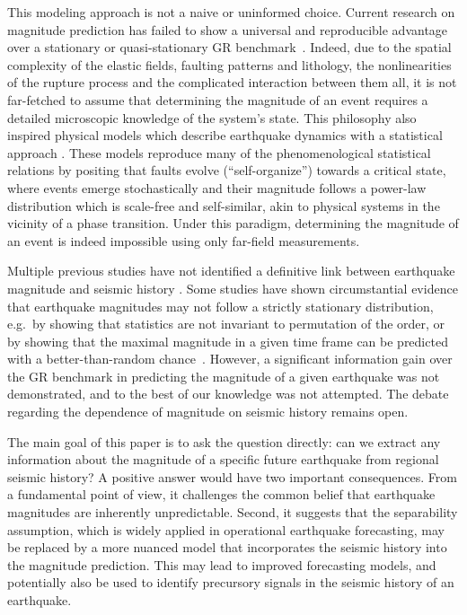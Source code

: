 \documentclass[pdflatex]{sn-jnl}
\begin{document}
This modeling approach is not a naive or uninformed choice.  Current research on magnitude prediction has failed to show a universal and reproducible advantage over a stationary or quasi-stationary GR benchmark~\cite{ogata_exploring_2018, stockman_forecasting_2023}. Indeed, due to the spatial complexity of the elastic fields, faulting patterns and lithology, the nonlinearities of the rupture process and the complicated interaction between them all, it is not far-fetched to assume that determining the magnitude of an event requires a detailed microscopic knowledge of the system's state. 
This philosophy also inspired physical models which describe earthquake dynamics with a statistical approach \cite{olami_self-organized_1992, sornette_self-organized_1989, bak_earthquakes_1989, de_geus_scaling_2022}. These models reproduce many of the phenomenological statistical relations by positing that faults evolve (``self-organize'') towards a critical state, where events emerge stochastically and their magnitude follows a power-law distribution which is scale-free and self-similar, akin to physical systems in the vicinity of a phase transition. Under this paradigm, determining the magnitude of an event is indeed impossible using only far-field measurements. 

Multiple previous studies have not identified a definitive link between earthquake magnitude and seismic history \cite{petrillo_verifying_2023, taroni_are_2024, davidsen_are_2011}. Some studies have shown circumstantial evidence that earthquake magnitudes may not follow a strictly stationary distribution, e.g.~by showing that statistics are not invariant to permutation of the order, or by showing that the maximal magnitude in a given time frame can be predicted with a better-than-random chance~\cite{xiong_seismic_2023, corral_comment_2005, spassiani_exploring_2016, lippiello_positive_2024, lippiello_positive_2024-1, lippiello_influence_2008, shcherbakov_forecasting_2019, panakkat_neural_2007}. However, a significant information gain over the GR benchmark in predicting the magnitude of a given earthquake was not demonstrated, and to the best of our knowledge was not attempted. The debate regarding the dependence of magnitude on seismic history remains open.

The main goal of this paper is to ask the question directly: can we extract any information about the magnitude of a specific future earthquake from regional seismic history? A positive answer would have two important consequences. From a fundamental point of view, it challenges the common belief that earthquake magnitudes are inherently unpredictable. Second, it suggests that the separability assumption, which is widely applied in operational earthquake forecasting, may be replaced by a more nuanced model that incorporates the seismic history into the magnitude prediction. This may lead to improved forecasting models, and potentially also be used to identify precursory signals in the seismic history of an earthquake.
\end{document}
